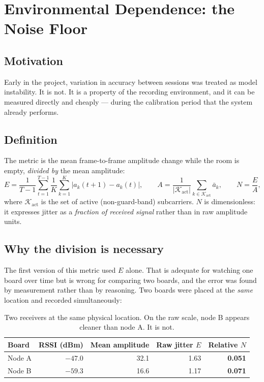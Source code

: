 \documentclass[11pt,a4paper]{article}
\begin{document}
\section{Environmental Dependence: the Noise Floor}
\label{sec:noise}

\subsection{Motivation}

Early in the project, variation in accuracy between sessions was treated as
model instability. It is not. It is a property of the recording environment,
and it can be measured directly and cheaply --- during the calibration period
that the system already performs.

\subsection{Definition}

The metric is the mean frame-to-frame amplitude change while the room is empty,
\emph{divided by} the mean amplitude:
\begin{equation}
  E = \frac{1}{T-1}\sum_{t=1}^{T-1}\frac{1}{K}\sum_{k=1}^{K}
      \bigl| a_k(t+1) - a_k(t) \bigr|,
  \qquad
  A = \frac{1}{|\mathcal{K}_{\mathrm{act}}|}\!\!\sum_{k \in \mathcal{K}_{\mathrm{act}}}\!\! \bar{a}_k,
  \qquad
  N = \frac{E}{A},
  \label{eq:noise}
\end{equation}
where $\mathcal{K}_{\mathrm{act}}$ is the set of active (non-guard-band)
subcarriers. $N$ is dimensionless: it expresses jitter as a \emph{fraction of
received signal} rather than in raw amplitude units.

\subsection{Why the division is necessary}

The first version of this metric used $E$ alone. That is adequate for watching
one board over time but is wrong for comparing two boards, and the error was
found by measurement rather than by reasoning. Two boards were placed at the
\emph{same} location and recorded simultaneously:

\begin{table}[H]
\centering
\caption{Two receivers at the same physical location. On the raw scale, node B
appears cleaner than node A. It is not.}
\label{tab:nodeab}
\begin{tabular}{@{}lrrrr@{}}
\toprule
\textbf{Board} & \textbf{RSSI (dBm)} & \textbf{Mean amplitude} & \textbf{Raw jitter $E$} & \textbf{Relative $N$} \\
\midrule
Node A & $-47.0$ & 32.1 & 1.63 & \textbf{0.051} \\
Node B & $-59.3$ & 16.6 & 1.17 & \textbf{0.071} \\
\bottomrule
\end{tabular}
\end{table}
\end{document}
